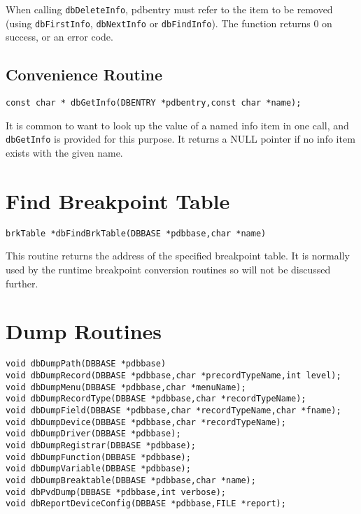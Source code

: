 When calling \verb|dbDeleteInfo|, pdbentry must refer to the item to be removed (using \verb|dbFirstInfo|, \verb|dbNextInfo| or \verb|dbFindInfo|).
The function returns 0 on success, or an error code.

\subsection{Convenience Routine}

\begin{verbatim}
const char * dbGetInfo(DBENTRY *pdbentry,const char *name);
\end{verbatim}

It is common to want to look up the value of a named info item in one call, and \verb|dbGetInfo| is provided for this purpose. It returns a NULL pointer if no info item exists with the given name.

\section{Find Breakpoint Table}

\begin{verbatim}
brkTable *dbFindBrkTable(DBBASE *pdbbase,char *name)
\end{verbatim}

This routine returns the address of the specified breakpoint table.
It is normally used by the runtime breakpoint conversion routines so will not be discussed further.

\section{Dump Routines}

\begin{verbatim}
void dbDumpPath(DBBASE *pdbbase)
void dbDumpRecord(DBBASE *pdbbase,char *precordTypeName,int level);
void dbDumpMenu(DBBASE *pdbbase,char *menuName);
void dbDumpRecordType(DBBASE *pdbbase,char *recordTypeName);
void dbDumpField(DBBASE *pdbbase,char *recordTypeName,char *fname);
void dbDumpDevice(DBBASE *pdbbase,char *recordTypeName);
void dbDumpDriver(DBBASE *pdbbase);
void dbDumpRegistrar(DBBASE *pdbbase);
void dbDumpFunction(DBBASE *pdbbase);
void dbDumpVariable(DBBASE *pdbbase);
void dbDumpBreaktable(DBBASE *pdbbase,char *name);
void dbPvdDump(DBBASE *pdbbase,int verbose);
void dbReportDeviceConfig(DBBASE *pdbbase,FILE *report);
\end{verbatim}

